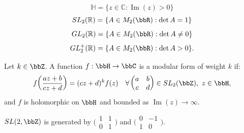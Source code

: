 \begin{definition}
\[
\mathbb{H}=\{z\in\mathbb{C}:\operatorname{Im}(z)>0\}\] 
\[SL_2(\mathbb{R})=\{A\in M_2(\bbR):\det A=1\}\] 
\[GL_2(\mathbb{R})=\{A\in M_2(\bbR):\det A\neq0\}\]
\[GL_2^+(\mathbb{R})=\{A\in M_2(\bbR):\det A>0\}.\]
\end{definition}



\begin{definition}
Let $k \in \bbZ$. A function $f:\bbH \to \bbC$ is a modular form of weight $k$ if:
\[
f\!\left(\frac{az+b}{cz+d}\right) = (cz+d)^k f(z)
\quad \forall 
\begin{pmatrix} a & b \\ c & d \end{pmatrix} \in SL_2(\bbZ),\ z \in \bbH,
\]
and $f$ is holomorphic on $\bbH$ and bounded as $\operatorname{Im}(z)\to\infty$.
\end{definition}


\fact\label{fact of generation of SL}{$SL(2,\bbZ)$ is generated by $\bigg(\begin{matrix}1&1 \\0&1 \end{matrix}\bigg) $ and $ \bigg(\begin{matrix}0&-1 \\1&0 \end{matrix}\bigg) $. \cite[Theorem~3.3]{KonradNotes} }

